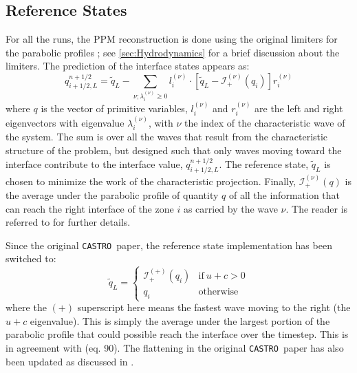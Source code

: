 \documentclass[iop]{../emulateapj}
\newcommand{\castro}{\texttt{CASTRO}}
\begin{document}
\subsection{Reference States}

For all the runs, the PPM reconstruction is done using the original limiters for
the parabolic profiles \citep{ppm}; see \autoref{sec:Hydrodynamics} for a brief 
discussion about the limiters.  The prediction of the interface
states appears as:
\begin{equation}
\label{eq:ppmstatel}
q_{i+1/2,L}^{n+1/2} = \tilde{q}_L -
   \sum_{\nu;\lambda_i^{(\nu)}\ge 0} l_i^{(\nu)} \cdot \left [
        \tilde{q}_L  - \mathcal{I}^{(\nu)}_+(q_i)
       \right ] r_i^{(\nu)}
\end{equation}
where $q$ is the vector of primitive variables, $l_i^{(\nu)}$ and
$r_i^{(\nu)}$ are the left and right eigenvectors with eigenvalue
$\lambda_i^{(\nu)}$, with $\nu$ the index of the characteristic wave of
the system.  The sum is over all the waves that result from the
characteristic structure of the problem, but designed such that only
waves moving toward the interface contribute to the interface value,
$q_{i+1/2,L}^{n+1/2}$.  The reference state, $\tilde{q}_L$ is
chosen to minimize the work of the characteristic projection.
Finally, $\mathcal{I}_+^{(\nu)}(q)$ is the
average under the parabolic profile of quantity $q$ of all the
information that can reach the right interface of the zone $i$ as
carried by the wave $\nu$.  The reader is referred to
\citet{ppmunsplit} for further details.

Since the original \castro\ paper, the reference state implementation
has been switched to:
\begin{equation}
\label{eq:refchoice}
\tilde{q}_L = \left \{ \begin{array}{cc}
       \mathcal{I}_+^{(+)}(q_i) & \mathrm{if~} u + c > 0 \\
       q_i                    & \mathrm{otherwise}
\end{array}
\right .
\end{equation}
where the $(+)$ superscript here means the fastest wave moving to the right
(the $u+c$ eigenvalue).   This is simply the average under the largest
portion of the parabolic profile that could possible reach the interface 
over the timestep.  This is
in agreement with \citet{ppmunsplit} (eq. 90).  The flattening
in the original \castro\ paper has also been updated as discussed
in \citet{zingalekatz:2015}.
\end{document}
